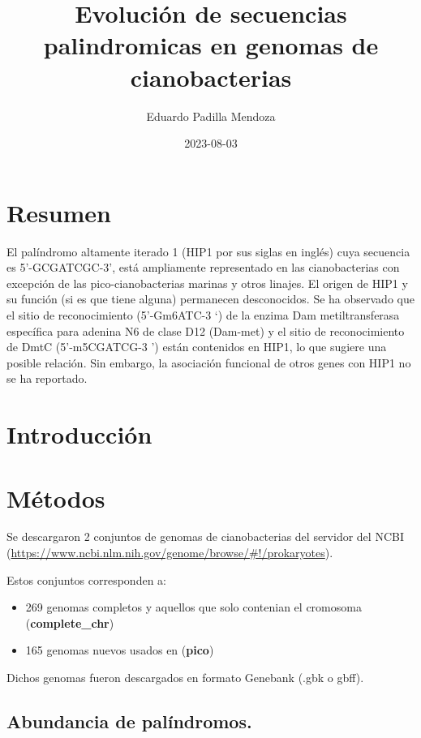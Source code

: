 \documentclass[
]{book}
\title{Evolución de secuencias palindromicas en genomas de cianobacterias}
\author{Eduardo Padilla Mendoza}
\date{2023-08-03}
\providecommand{\tightlist}{%
  \setlength{\itemsep}{0pt}\setlength{\parskip}{0pt}}
\begin{document}
\maketitle

{
\setcounter{tocdepth}{1}
\tableofcontents
}
\hypertarget{resumen}{%
\chapter*{Resumen}\label{resumen}}

El palíndromo altamente iterado 1 (HIP1 por sus siglas en inglés) cuya secuencia es 5'-GCGATCGC-3', está ampliamente representado en las cianobacterias con excepción de las pico-cianobacterias marinas y otros linajes. El origen de HIP1 y su función (si es que tiene alguna) permanecen desconocidos. Se ha observado que el sitio de reconocimiento (5'-Gm6ATC-3 `) de la enzima Dam metiltransferasa específica para adenina N6 de clase D12 (Dam-met) y el sitio de reconocimiento de DmtC (5'-m5CGATCG-3 ') están contenidos en HIP1, lo que sugiere una posible relación. Sin embargo, la asociación funcional de otros genes con HIP1 no se ha reportado.

\hypertarget{introducciuxf3n}{%
\chapter{Introducción}\label{introducciuxf3n}}

\hypertarget{muxe9todos}{%
\chapter{Métodos}\label{muxe9todos}}

Se descargaron 2 conjuntos de genomas de cianobacterias del servidor del NCBI (\url{https://www.ncbi.nlm.nih.gov/genome/browse/\#!/prokaryotes}).

Estos conjuntos corresponden a:

\begin{itemize}
\tightlist
\item
  269 genomas completos y aquellos que solo contenian el cromosoma (\textbf{complete\_chr})
\item
  165 genomas nuevos usados en \citet{cabello2022elucidating} (\textbf{pico})
\end{itemize}

Dichos genomas fueron descargados en formato Genebank (.gbk o gbff).

\hypertarget{abundancia-de-paluxedndromos.}{%
\section{Abundancia de palíndromos.}\label{abundancia-de-paluxedndromos.}}
\end{document}
